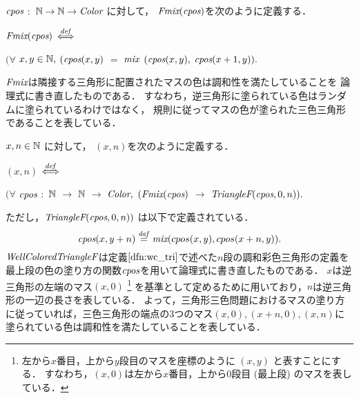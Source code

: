\begin{dfn}[$\Fmix$]
  $\textit{cpos}$ $:$ $\mathbb{N} \to \mathbb{N} \to \textit{Color}$ に対して，
  $\textit{Fmix}(\textit{cpos})$を次のように定義する．

  
  $\textit{Fmix}(\textit{cpos})$ $\overset{{\it def}}{\Longleftrightarrow}$
  
  $(\forall$ $x,y \in\mathbb{N},$
  $(\textit{cpos}(x,y)$ $=$ $\textit{mix}$ $(\textit{cpos}(x,y),$ $\textit{cpos}(x+1,y)).$

  $\Fmix$は隣接する三角形に配置されたマスの色は調和性を満たしていることを
  論理式に書き直したものである．
  すなわち，逆三角形に塗られている色はランダムに塗られているわけではなく，
  規則に従ってマスの色が塗られた三色三角形であることを表している．
\end{dfn}


\begin{dfn}[$\WCTF$]
  $x, n \in \mathbb{N}$ に対して，
  \WCTF$(x, n)$を次のように定義する．
  
  \WCT$(x, n)$ $\overset{{\it def}}{\Longleftrightarrow}$
  
  $(\forall$ $\textit{cpos}$ $:$ $\mathbb{N}$ $\to$ $\mathbb{N}$ $\to$ $\textit{Color},$
  $(\textit{Fmix}(\textit{cpos})$ $\to$ $\textit{TriangleF}(\textit{cpos},0,n)).$

  ただし，$\textit{TriangleF}(\textit{cpos},0,n))$ は以下で定義されている．
  \[
  \textit{cpos}(x,y+n) \overset{{\it def}}{=} \textit{mix}(cpos(x,y),cpos(x+n,y)).
  \]
  $\WCTF$は定義$\ref{dfn:wc_tri}$で述べた$n$段の調和彩色三角形の定義を最上段の色の塗り方の関数$\textit{cpos}$を用いて論理式に書き直したものである．
  $x$は逆三角形の左端のマス$(x,0)$
  \footnote
      {
        左から$x$番目，上から$y$段目のマスを座標のように $(x,y)$ と表すことにする．
        すなわち，$(x,0)$は左から$x$番目，上から$0$段目 (最上段) のマスを表している．
      }
  を基準として定めるために用いており，$n$は逆三角形の一辺の長さを表している．
  よって，三角形三色問題におけるマスの塗り方に従っていれば，三色三角形の端点の$3$つのマス$(x,0), (x+n,0), (x,n)$に塗られている色は調和性を満たしていることを表している．
\end{dfn}

